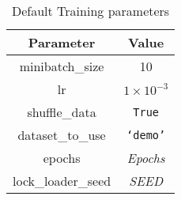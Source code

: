 \begin{table}[ht]
\centering
  \begin{tabular}{|| c | c ||}
  \hline
  Parameter & Value \\
  \hline
  minibatch\_size & 10 \\
  lr & $1\times 10^{-3}$ \\
  shuffle\_data & \texttt{True} \\
  dataset\_to\_use & \texttt{`demo'} \\
  epochs & \emph{Epochs} \\
  lock\_loader\_seed & \emph{SEED} \\
  \hline
  \end{tabular}\caption{Default Training parameters}\label{tab:eval-training-params}
\end{table}